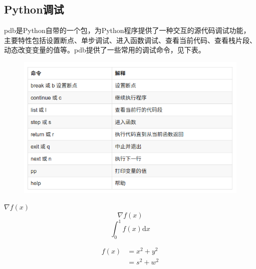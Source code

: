 \documentclass[12pt,a4paper]{article}
\title{}
\author{作者}
\date{\chntoday}
\begin{document}
\maketitle
\newpage
\subsection{Python调试}
pdb是Python自带的一个包，为Python程序提供了一种交互的源代码调试功能，主要特性包括设置断点、单步调试、进入函数调试、查看当前代码、查看栈片段、动态改变变量的值等。pdb提供了一些常用的调试命令，见下表。
\begin{figure}[H]
\centering
\includegraphics[scale=0.5]{./figures/Figure_1.png}
\end{figure}
$\nabla f(x)$
$$\nabla f(x)$$
\begin{equation}
    \int_0^1f(x)\mathrm{d}x
\end{equation}

\begin{equation*}
\begin{aligned}
f(x)&=x^2+y^2\\
&=s^2+w^2
\end{aligned}
\end{equation*}














































\cite{tam19912d}

\end{document}
